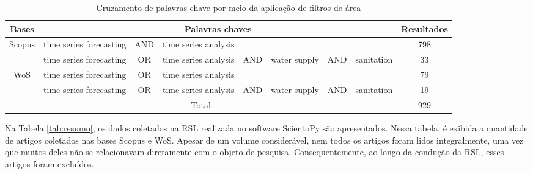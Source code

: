 \begin{table}[H]
	\centering
	\caption{Cruzamento de palavras-chave por meio da aplicação de filtros de área}\label{tb1}
	\begin{tabular}{@{}cp{2cm}cp{2cm}cp{1.5cm}cp{2cm}c@{}}
			\toprule
			Bases                   & \multicolumn{7}{c}{Palavras chaves}                                                          & Resultados \\ \midrule
			\multirow{2}{*}{Scopus} & time series forecasting & AND & time series analysis &     &              &     &            & 798        \\
			& time series forecasting & OR  & time series analysis & AND & water supply & AND & sanitation & 33         \\
			\multirow{2}{*}{WoS}    & time series forecasting & OR  & time series analysis &     &              &     &            & 79         \\
			& time series forecasting & OR  & time series analysis & AND & water supply & AND & sanitation & 19         \\ \hline
			\multicolumn{8}{c}{Total}                                                                                              & 929        \\ \bottomrule
		\end{tabular}
	
	
\end{table}



Na Tabela \ref{tab:resumo}, os dados coletados na RSL realizada no software ScientoPy  são apresentados. Nessa tabela, é exibida a quantidade de artigos coletados nas bases Scopus e WoS. Apesar de um volume considerável, nem todos os artigos foram lidos integralmente, uma vez que muitos deles não se relacionavam diretamente com o objeto de pesquisa. Consequentemente, ao longo da condução da RSL, esses artigos foram excluídos.

